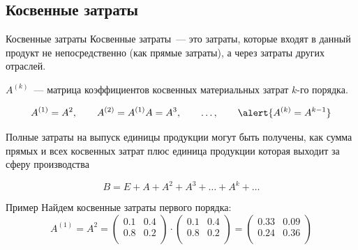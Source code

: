 \documentclass[unicode,11pt,notheorems,xcolor=table]{beamer}
\begin{document}
\subsection{Косвенные затраты}

\begin{frame}{Косвенные затраты}
	\alert{Косвенные затраты}~--- это затраты, которые входят в данный продукт не непосредственно (как прямые затраты), а через затраты других
	отраслей. 
	
	\medskip
	 $A^{(k)}$~--- матрица коэффициентов косвенных материальных затрат $k$-го порядка. 
	
	\medskip
	$$
		A^{(1)}=A^2,
		\qquad 
		A^{(2)}=A^{(1)}A=A^3,
		\qquad 
		\ldots,
		\qquad 
		\alert{A^{(k)} = A^{k-1}}
	$$
	

	\begin{block}{}
	Полные затраты на выпуск единицы продукции могут быть получены, как сумма прямых и всех косвенных затрат плюс единица продукции которая выходит за сферу производства
	
	$$
		B= E+A+A^2+A^3+\ldots + A^k+ \ldots
	$$
	\end{block}
\end{frame}

\begin{frame}{Пример}
	Найдем косвенные затраты первого порядка:
	$$
	A^{(1)} = A^2 = 
	\begin{pmatrix}
		0.1 & 0.4\\ 
		0.8 & 0.2\\ 
	\end{pmatrix} 
	\cdot
	\begin{pmatrix}
		0.1 & 0.4\\ 
		0.8 & 0.2\\ 
	\end{pmatrix} 
	=
	\begin{pmatrix}
		0.33 & 0.09\\ 
		0.24 & 0.36\\ 
	\end{pmatrix} 
	$$
\end{frame}
\end{document}

